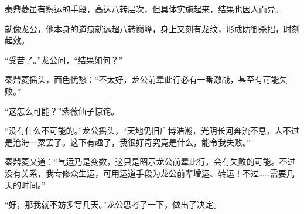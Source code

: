 \begin{this_body}
秦鼎菱虽有察运的手段，高达八转层次，但具体实施起来，结果也因人而异。

就像龙公，他本身的道痕就远超八转巅峰，身上又刻有龙纹，形成防御杀招，时刻起效。

“受苦了。”龙公问，“结果如何？”

秦鼎菱摇头，面色忧愁：“不太好，龙公前辈此行必有一番激战，甚至有可能失败。”

“这怎么可能？”紫薇仙子惊诧。

“没有什么不可能的。”龙公摇头，“天地仍旧广博浩瀚，光阴长河奔流不息，人不过是沧海一粟罢了。这下有趣了，我很好奇究竟是什么，能令我失败。”

秦鼎菱又道：“气运乃是变数，这只是昭示龙公前辈此行，会有失败的可能。不过没有关系，我专修众生运，可用运道手段为龙公前辈增运、转运！不过……需要几天的时间。”

“好，那我就不妨多等几天。”龙公思考了一下，做出了决定。

\end{this_body}


